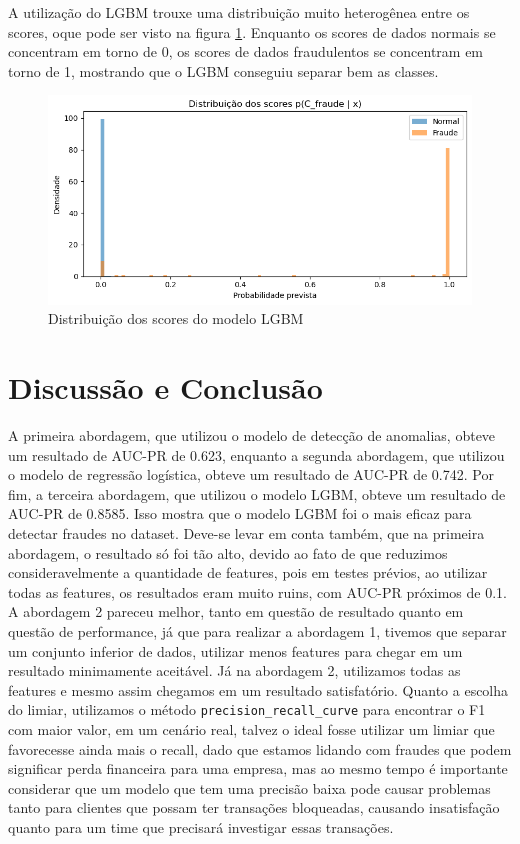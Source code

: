 \documentclass[conference]{IEEEtran}
\begin{document}
A utilização do LGBM trouxe uma distribuição muito heterogênea entre os scores, oque pode ser visto na figura \ref{fig:distribuicao_scores_lgbm}. Enquanto os scores de dados normais se concentram em torno de 0, os scores de dados fraudulentos se concentram em torno de 1, mostrando que o LGBM conseguiu separar bem as classes.
\begin{figure}[H]
    \centerline{\includegraphics[width=1\linewidth]{../output/distribuicao scores lgbm.png}}
    \caption{Distribuição dos scores do modelo LGBM}
    \label{fig:distribuicao_scores_lgbm}
\end{figure}

\section{Discussão e Conclusão}
\label{sec:conclusao}
A primeira abordagem, que utilizou o modelo de detecção de anomalias, obteve um resultado de AUC-PR de 0.623, enquanto a segunda abordagem, que utilizou o modelo de regressão logística, obteve um resultado de AUC-PR de 0.742. Por fim, a terceira abordagem, que utilizou o modelo LGBM, obteve um resultado de AUC-PR de 0.8585. Isso mostra que o modelo LGBM foi o mais eficaz para detectar fraudes no dataset. Deve-se levar em conta também, que na primeira abordagem, o resultado só foi tão alto, devido ao fato de que reduzimos consideravelmente a quantidade de features, pois em testes prévios, ao utilizar todas as features, os resultados eram muito ruins, com AUC-PR próximos de 0.1. A abordagem 2 pareceu melhor, tanto em questão de resultado quanto em questão de performance, já que para realizar a abordagem 1, tivemos que separar um conjunto inferior de dados, utilizar menos features para chegar em um resultado minimamente aceitável. Já na abordagem 2, utilizamos todas as features e mesmo assim chegamos em um resultado satisfatório. Quanto a escolha do limiar, utilizamos o método \texttt{precision\_recall\_curve} para encontrar o F1 com maior valor, em um cenário real, talvez o ideal fosse utilizar um limiar que favorecesse ainda mais o recall, dado que estamos lidando com fraudes que podem significar perda financeira para uma empresa, mas ao mesmo tempo é importante considerar que um modelo que tem uma precisão baixa pode causar problemas tanto para clientes que possam ter transações bloqueadas, causando insatisfação quanto para um time que precisará investigar essas transações.
\end{document}
